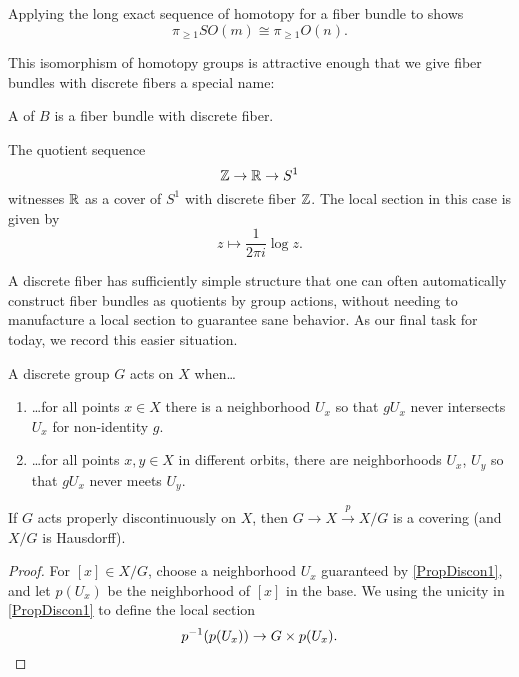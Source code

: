 \begin{example}
Applying the long exact sequence of homotopy for a fiber bundle to  shows \[\pi_{\ge 1} SO(m) \cong \pi_{\ge 1} O(n).\]
\end{example}

This isomorphism of homotopy groups is attractive enough that we give fiber bundles with discrete fibers a special name:

\begin{definition}
A  of $B$ is a fiber bundle with discrete fiber.
\end{definition}

\begin{example}
The quotient sequence \[\mathbb Z \to \mathbb R \to S^1\] witnesses $\mathbb R$ as a cover of $S^1$ with discrete fiber $\mathbb Z$.
The local section in this case is given by \[z \mapsto \frac{1}{2 \pi i} \log z.\]
\end{example}

A discrete fiber has sufficiently simple structure that one can often automatically construct fiber bundles as quotients by group actions, without needing to manufacture a local section to guarantee sane behavior.
As our final task for today, we record this easier situation.

\begin{definition}
A discrete group $G$ acts  on $X$ when\ldots
\begin{enumerate}
    \item \ldots for all points $x \in X$ there is a neighborhood $U_x$ so that $g U_x$ never intersects $U_x$ for non-identity $g$.\label{PropDiscon1}
    \item \ldots for all points $x, y \in X$ in different orbits, there are neighborhoods $U_x$, $U_y$ so that $gU_x$ never meets $U_y$.\label{PropDiscon2}
\end{enumerate}
\end{definition}

\begin{lemma}
If $G$ acts properly discontinuously on $X$, then $G \to X \xrightarrow p X/G$ is a covering (and $X/G$ is Hausdorff).
\end{lemma}
\begin{proof}
For $[x] \in X/G$, choose a neighborhood $U_x$ guaranteed by \eqref{PropDiscon1}, and let $p(U_x)$ be the neighborhood of $[x]$ in the base.  We using the unicity in \eqref{PropDiscon1} to define the local section \[p^{-1}(p(U_x)) \to G \times p(U_x). \qedhere\]
\end{proof}

